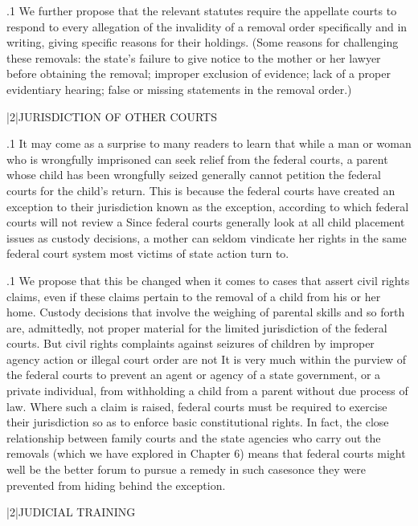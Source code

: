 \documentclass[11pt, twoside]{article}
\begin{document}
{\p.1{%
We further propose that the relevant statutes require the appellate
courts to respond to every allegation of the invalidity of a removal order specifically and in writing, giving specific reasons for their holdings.
(Some reasons for challenging these removals: the state’s failure to give
notice to the mother or her lawyer before obtaining the removal; improper exclusion of evidence; lack of a proper evidentiary hearing; false
or missing statements in the removal order.)
}%


\s|2|{JURISDICTION OF OTHER COURTS}

\p.1{%
\noindent{}It may come as a surprise to many readers to learn that while a man or
woman who is wrongfully imprisoned can seek relief from the federal
courts, a parent whose child has been wrongfully seized generally cannot petition the federal courts for the child’s return. This is because the
federal courts have created an exception to their jurisdiction known as
the  exception, according to which federal courts
will not review a  Since federal courts generally look
at all child placement issues as custody decisions, a mother can seldom
vindicate her rights in the same federal court system most victims of
state action turn to.
}%

\p.1{%
We propose that this be changed when it comes to cases that assert civil rights claims, even if these claims pertain to the removal of
a child from his or her home. Custody decisions that involve the weighing of parental skills and so forth are, admittedly, not proper material
for the limited jurisdiction of the federal courts. But civil rights complaints against seizures of children by improper agency action or illegal
court order are not  It is very much within the purview
of the federal courts to prevent an agent or agency of a state government,
or a private individual, from withholding a child from a parent without
due process of law. Where such a claim is raised, federal courts must
be required to exercise their jurisdiction so as to enforce basic constitutional rights. In fact, the close relationship between family courts and
the state agencies who carry out the removals (which we have explored
in Chapter 6) means that federal courts might well be the better forum to
pursue a remedy in such cases\mdash{}once they were prevented from hiding
behind the  exception.
}%


\s|2|{JUDICIAL TRAINING}

}
\end{document}
